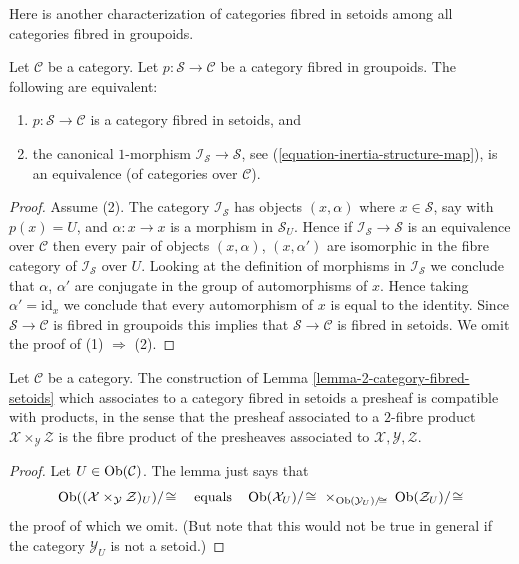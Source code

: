 \noindent
Here is another characterization of categories fibred in setoids
among all categories fibred in groupoids.

\begin{lemma}
\label{lemma-characterize-fibred-setoids-inertia}
Let $\mathcal{C}$ be a category.
Let $p : \mathcal{S} \to \mathcal{C}$ be a category fibred in groupoids.
The following are equivalent:
\begin{enumerate}
\item $p : \mathcal{S} \to \mathcal{C}$ is a category fibred in setoids, and
\item the canonical $1$-morphism $\mathcal{I}_\mathcal{S} \to \mathcal{S}$,
see (\ref{equation-inertia-structure-map}), is an equivalence (of categories
over $\mathcal{C}$).
\end{enumerate}
\end{lemma}

\begin{proof}
Assume (2). The category $\mathcal{I}_\mathcal{S}$ has objects
$(x, \alpha)$ where $x \in \mathcal{S}$, say with $p(x) = U$, and
$\alpha : x \to x$ is a morphism in $\mathcal{S}_U$. Hence if
$\mathcal{I}_\mathcal{S} \to \mathcal{S}$ is an equivalence over $\mathcal{C}$
then every pair of objects $(x, \alpha)$, $(x, \alpha')$ are isomorphic
in the fibre category of $\mathcal{I}_\mathcal{S}$ over $U$.
Looking at the definition of morphisms in $\mathcal{I}_\mathcal{S}$
we conclude that $\alpha$, $\alpha'$ are conjugate in the group
of automorphisms of $x$. Hence taking $\alpha' = \text{id}_x$ we conclude
that every automorphism of $x$ is equal to the identity.
Since $\mathcal{S} \to \mathcal{C}$ is fibred in groupoids this
implies that $\mathcal{S} \to \mathcal{C}$ is fibred in setoids.
We omit the proof of (1) $\Rightarrow$ (2).
\end{proof}

\begin{lemma}
\label{lemma-category-fibred-setoids-presheaves-products}
Let $\mathcal{C}$ be a category.
The construction of
Lemma \ref{lemma-2-category-fibred-setoids}
which associates to a category fibred in setoids a presheaf is
compatible with products, in the sense that the presheaf associated
to a $2$-fibre product $\mathcal{X} \times_\mathcal{Y} \mathcal{Z}$
is the fibre product of the presheaves associated to
$\mathcal{X}, \mathcal{Y}, \mathcal{Z}$.
\end{lemma}

\begin{proof}
Let $U \in \mathop{\mathrm{Ob}}\nolimits(\mathcal{C})$. The lemma just says that
$$
\mathop{\mathrm{Ob}}\nolimits((\mathcal{X} \times_\mathcal{Y} \mathcal{Z})_U)/\!\cong
\quad \text{equals} \quad
\mathop{\mathrm{Ob}}\nolimits(\mathcal{X}_U)/\!\cong
\ \times_{\mathop{\mathrm{Ob}}\nolimits(\mathcal{Y}_U)/\!\cong}
\ \mathop{\mathrm{Ob}}\nolimits(\mathcal{Z}_U)/\!\cong
$$
the proof of which we omit. (But note that this would not be true
in general if the category $\mathcal{Y}_U$ is not a setoid.)
\end{proof}










